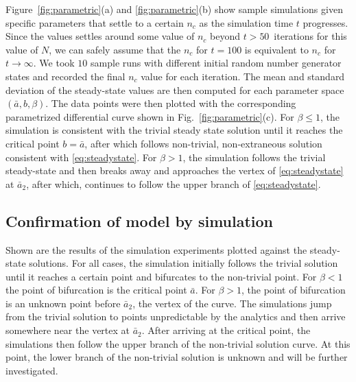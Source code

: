 Figure~\ref{fig:parametric}(a) and \ref{fig:parametric}(b) show sample simulations given specific parameters that settle to a certain $n_{c}$ as the simulation time $t$ progresses.
Since the values settles around some value of $n_{c}$ beyond $t>50$~iterations for this value of $N$, we can safely assume that the $n_{c}$ for $t = 100$ is equivalent to $n_{c}$ for $t \rightarrow \infty$.
We took $10$ sample runs with different initial random number generator states and recorded the final $n_{c}$ value for each iteration.
The mean and standard deviation of the steady-state values are then computed for each parameter space $(\bar{a},b,\beta)$.
The data points were then plotted with the corresponding parametrized differential curve shown in Fig.~\ref{fig:parametric}(c). 
For $\beta \leq 1$, the simulation is consistent with the trivial steady state solution until it reaches the critical point $b=\bar{a}$, after which follows non-trivial, non-extraneous solution consistent with \eqref{eq:steadystate}.
For $\beta > 1$, the simulation follows the trivial steady-state and then breaks away and approaches the vertex of \eqref{eq:steadystate} at $\bar{a}_{2}$, after which, continues to follow the upper branch of \eqref{eq:steadystate}.    

\subsection{Confirmation of model by simulation}
Shown are the results of the simulation experiments plotted against the steady-state solutions. For all cases, the simulation initially follows the trivial solution until it reaches a certain point and bifurcates to the non-trivial point. For $\beta < 1$ the point of bifurcation is the critical point $\bar{a}$. For $\beta > 1$, the point of bifurcation is an unknown point before $\bar{a}_{2}$, the vertex of the curve. The simulations jump from the trivial solution to points unpredictable by the analytics and then arrive somewhere near the vertex at $\bar{a}_{2}$. After arriving at the critical point, the simulations then follow the upper branch of the non-trivial solution curve. At this point, the lower branch of the non-trivial solution is unknown and will be further investigated. 


